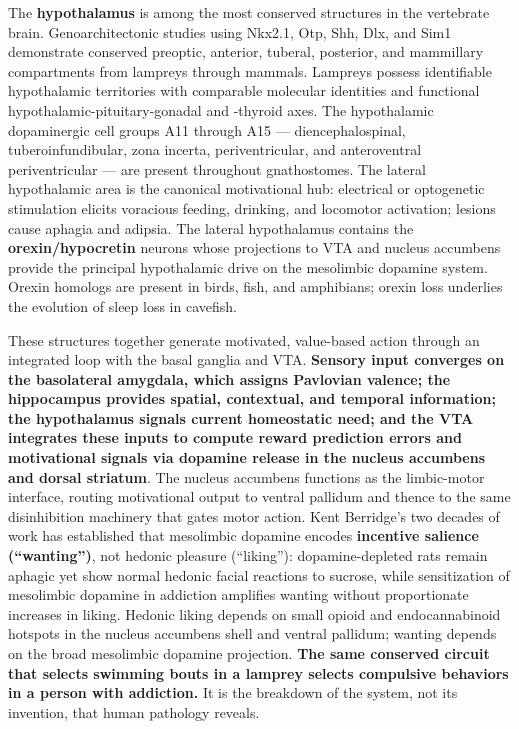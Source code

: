 The \textbf{hypothalamus} is among the most conserved structures in the vertebrate brain. Genoarchitectonic studies using Nkx2.1, Otp, Shh, Dlx, and Sim1 demonstrate conserved preoptic, anterior, tuberal, posterior, and mammillary compartments from lampreys through mammals. Lampreys possess identifiable hypothalamic territories with comparable molecular identities and functional hypothalamic-pituitary-gonadal and -thyroid axes. The hypothalamic dopaminergic cell groups A11 through A15 --- diencephalospinal, tuberoinfundibular, zona incerta, periventricular, and anteroventral periventricular --- are present throughout gnathostomes. The lateral hypothalamic area is the canonical motivational hub: electrical or optogenetic stimulation elicits voracious feeding, drinking, and locomotor activation; lesions cause aphagia and adipsia. The lateral hypothalamus contains the \textbf{orexin/hypocretin} neurons whose projections to VTA and nucleus accumbens provide the principal hypothalamic drive on the mesolimbic dopamine system. Orexin homologs are present in birds, fish, and amphibians; orexin loss underlies the evolution of sleep loss in cavefish.

These structures together generate motivated, value-based action through an integrated loop with the basal ganglia and VTA. \textbf{Sensory input converges on the basolateral amygdala, which assigns Pavlovian valence; the hippocampus provides spatial, contextual, and temporal information; the hypothalamus signals current homeostatic need; and the VTA integrates these inputs to compute reward prediction errors and motivational signals via dopamine release in the nucleus accumbens and dorsal striatum}. The nucleus accumbens functions as the limbic-motor interface, routing motivational output to ventral pallidum and thence to the same disinhibition machinery that gates motor action. Kent Berridge's two decades of work has established that mesolimbic dopamine encodes \textbf{incentive salience (``wanting'')}, not hedonic pleasure (``liking''): dopamine-depleted rats remain aphagic yet show normal hedonic facial reactions to sucrose, while sensitization of mesolimbic dopamine in addiction amplifies wanting without proportionate increases in liking. Hedonic liking depends on small opioid and endocannabinoid hotspots in the nucleus accumbens shell and ventral pallidum; wanting depends on the broad mesolimbic dopamine projection. \textbf{The same conserved circuit that selects swimming bouts in a lamprey selects compulsive behaviors in a person with addiction.} It is the breakdown of the system, not its invention, that human pathology reveals.

